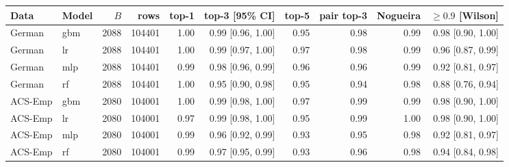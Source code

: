 \begin{tabular}{llrrrrrrrr}
\toprule
Data & Model & $B$ & rows & top-1 & top-3 [95\% CI] & top-5 & pair top-3 & Nogueira & $\ge0.9$ [Wilson]\\
\midrule
German & gbm & 2088 & 104401 & 1.00 & 0.99 [0.96, 1.00] & 0.95 & 0.98 & 0.99 & 0.98 [0.90, 1.00]\\
German & lr & 2088 & 104401 & 1.00 & 0.99 [0.97, 1.00] & 0.97 & 0.98 & 0.99 & 0.96 [0.87, 0.99]\\
German & mlp & 2088 & 104401 & 0.99 & 0.98 [0.96, 0.99] & 0.96 & 0.96 & 0.99 & 0.92 [0.81, 0.97]\\
German & rf & 2088 & 104401 & 1.00 & 0.95 [0.90, 0.98] & 0.95 & 0.94 & 0.98 & 0.88 [0.76, 0.94]\\
ACS-Emp & gbm & 2080 & 104001 & 1.00 & 0.99 [0.98, 1.00] & 0.97 & 0.99 & 0.99 & 0.98 [0.90, 1.00]\\
ACS-Emp & lr & 2080 & 104001 & 0.97 & 0.99 [0.98, 1.00] & 0.95 & 0.99 & 1.00 & 0.98 [0.90, 1.00]\\
ACS-Emp & mlp & 2080 & 104001 & 0.99 & 0.96 [0.92, 0.99] & 0.93 & 0.95 & 0.98 & 0.92 [0.81, 0.97]\\
ACS-Emp & rf & 2080 & 104001 & 0.99 & 0.97 [0.95, 0.99] & 0.93 & 0.96 & 0.98 & 0.94 [0.84, 0.98]\\
\bottomrule
\end{tabular}
